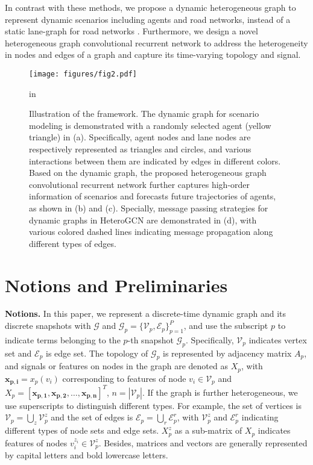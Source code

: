 \documentclass[letterpaper, 10 pt, conference]{ieeeconf}
\begin{document}
In contrast with these methods, we propose a  dynamic heterogeneous graph to represent dynamic scenarios including agents and road networks, instead of a static lane-graph for road networks \cite{liang2020learning,zeng2021lanercnn,gilles2021gohome}. Furthermore,  we design a novel  heterogeneous graph convolutional recurrent network to address the heterogeneity in nodes and edges of a graph and capture its time-varying topology and signal.

\begin{figure*}[tp]
\begin{center}
\centerline{\texttt{[image: figures/fig2.pdf]}}
\caption{Illustration of the framework. The dynamic graph for scenario modeling is demonstrated with a randomly selected agent (yellow triangle) in (a). Specifically, agent nodes and lane nodes are respectively represented as triangles and circles, and various interactions between them are indicated by edges in different colors. Based on the dynamic graph, the proposed heterogeneous graph convolutional recurrent network further captures high-order information of scenarios and forecasts future trajectories of agents, as shown in (b) and (c). Specially, message passing strategies for dynamic graphs in HeteroGCN are demonstrated in (d), with various colored dashed lines indicating message propagation along different types of edges.} \label{fig.1}
\label{fig:node_spec}
\end{center}
 in
\end{figure*}

\section{Notions and Preliminaries}
\textbf{Notions.} In this paper, we represent a discrete-time  dynamic graph and its discrete snapshots  with $\mathcal{G}$ and $\mathcal{G}_p= \{\mathcal{V}_p, \mathcal{E}_p\}_{p=1}^P$,  and use the subscript $p$ to indicate terms belonging to the $p$-th snapshot $\mathcal{G}_p$. Specifically, $\mathcal{V}_p$ indicates vertex set and $\mathcal{E}_p$ is edge set. The topology of $\mathcal{G}_p$ is represented by adjacency matrix $A_p$, and signals or features on nodes in the graph are denoted as $X_p$, with $\bm{x_{p,i}}=x_p(v_i)$ corresponding to features of node $v_i \in \mathcal{V}_p$ and $X_p= \left[\bm{x_{p,1}}, \bm{x_{p,2}}, \dots, \bm{x_{p,n}} \right]^T$, $n=|\mathcal{V}_p|$. If the graph is further heterogeneous, we use superscripts to distinguish different types. For example, the set of vertices is $\mathcal{V}_p = \bigcup_{z } \mathcal{V}_p^z$ and the set of edges is $\mathcal{E}_p = \bigcup_{r} \mathcal{E}_p^r$, with $\mathcal{V}_p^z$ and $\mathcal{E}_p^r$ indicating different types of node sets and edge sets.  $X_p^z$ as a sub-matrix of $X_p$ indicates features of nodes  $v_i^{z_i} \in \mathcal{V}_p^z$. Besides, matrices and vectors are generally represented by capital letters and bold lowercase letters. 
\end{document}
